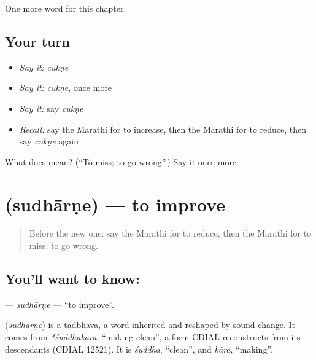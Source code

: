 \begin{grammarlens}[title={What you've built}]
One more word for this chapter.
\end{grammarlens}

\subsection*{Your turn}
\begin{itemize}
\raggedright
  \item \emph{Say it:} \emph{cukṇe}
  \item \emph{Say it:} \emph{cukṇe}, once more
  \item \emph{Say it:} say \emph{cukṇe}
  \item \emph{Recall:} say the Marathi for to increase, then the Marathi for to reduce, then say \emph{cukṇe} again
\end{itemize}

\begin{tcolorbox}[breakable,colback=teal!4,colframe=teal!35!black,title={Before you move on}]
What does  mean? (\textquotedblleft{}To miss; to go wrong\textquotedblright{}.) Say it once more.
\end{tcolorbox}
\section[\texorpdfstring{\mr{सुधारणे} (sudhārṇe)}{सुधारणे (sudhārṇe)}]{ (sudhārṇe) — to improve}

\label{lesson:MR-C165-sudharne}



\begin{quote}
Before the new one: say the Marathi for to reduce, then the Marathi for to miss; to go wrong.
\end{quote}

\subsection*{You'll want to know: }
\textbf{} — \emph{sudhārṇe} — \textquotedblleft{}to improve\textquotedblright{}.

\begin{cousinweb}
\textbf{} (\emph{sudhārṇe}) is a tadbhava, a word inherited and reshaped by sound change. It comes from \emph{*śuddhakāra}, \textquotedblleft{}making clean\textquotedblright{}, a form CDIAL reconstructs from its descendants (CDIAL 12521). It is \emph{śuddha}, \textquotedblleft{}clean\textquotedblright{}, and \emph{kāra}, \textquotedblleft{}making\textquotedblright{}.
\end{cousinweb}

